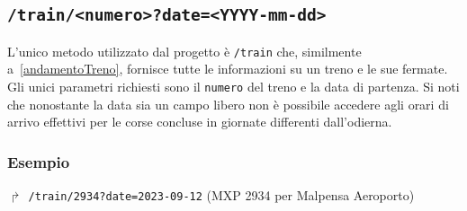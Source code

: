 \documentclass[12pt,italian]{report}
\begin{document}
\subsection{\texttt{/train/<numero>?date=<YYYY-mm-dd>}}

L'unico metodo utilizzato dal progetto è \texttt{/train} che,
similmente a~\ref{andamentoTreno}, fornisce tutte le informazioni su
un treno e le sue fermate.  Gli unici parametri richiesti sono il
\texttt{numero} del treno e la data di partenza.  Si noti che
nonostante la data sia un campo libero non è possibile accedere agli
orari di arrivo effettivi per le corse concluse in giornate differenti
dall'odierna.

\subsubsection{Esempio}
$\Rsh$ \texttt{/train/2934?date=2023-09-12} \hfill (MXP 2934 per
Malpensa Aeroporto)
\end{document}
